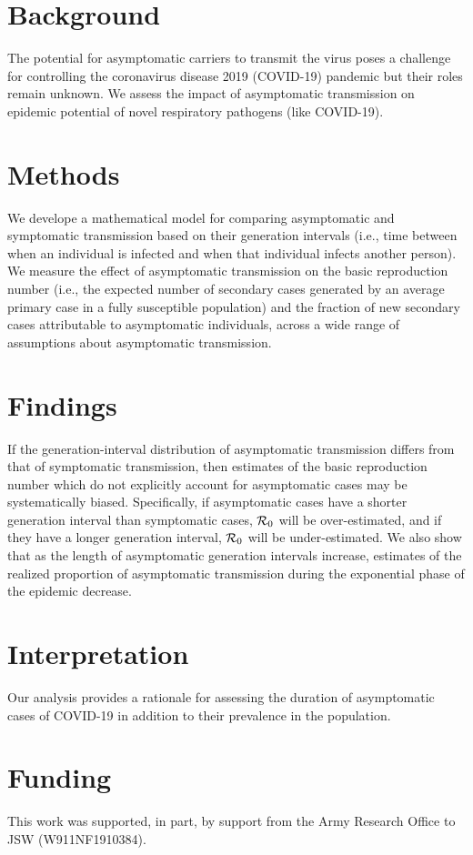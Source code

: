 {\footnotesize 
\section*{Background}

The potential for asymptomatic carriers to transmit the virus poses a challenge for controlling the coronavirus disease 2019 (COVID-19) pandemic but their roles remain unknown.
We assess the impact of asymptomatic transmission on epidemic potential of novel respiratory pathogens (like COVID-19).

\section*{Methods}

We develope a mathematical model for comparing asymptomatic and symptomatic transmission based on their generation intervals (i.e., time between when an individual is infected and when that individual infects another person).
We measure the effect of asymptomatic transmission on the basic reproduction number (i.e., the expected number of secondary cases generated by an average primary case in a fully susceptible population) and the fraction of new secondary cases attributable to asymptomatic individuals, across a wide range of assumptions about asymptomatic transmission.

\section*{Findings}

If the generation-interval distribution of asymptomatic transmission differs from that of symptomatic transmission, then estimates of the basic reproduction number which do not explicitly account for asymptomatic cases may be systematically biased. 
Specifically, if asymptomatic cases have a shorter generation interval than symptomatic cases, ${\cal{R}}_0$ will be over-estimated, and if they have a longer generation interval, ${\cal{R}}_0$ will be under-estimated.
We also show that as the length of asymptomatic generation intervals increase, estimates of the realized proportion of asymptomatic transmission during the exponential phase of the epidemic decrease.

\section*{Interpretation}

Our analysis provides a rationale for assessing the duration of asymptomatic cases of COVID-19 in addition to their prevalence in the population.

\section*{Funding}

This work was supported, in part, by support from the Army Research Office to JSW (W911NF1910384).
}
